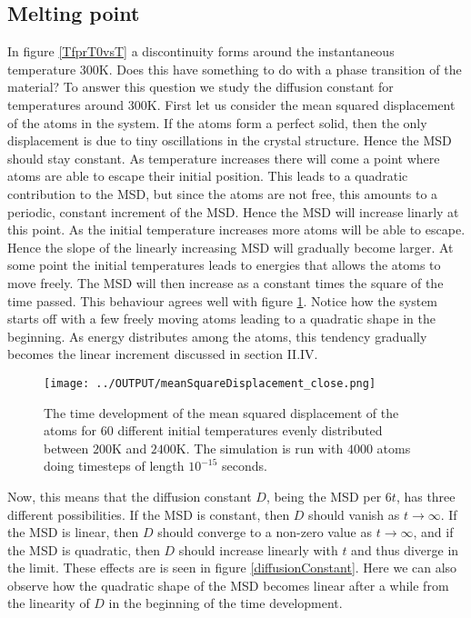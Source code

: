 \documentclass[twoside,utf8]{article}
\begin{document}
\begin{multicols}{2}
\subsection{Melting point}
In figure \ref*{TfprT0vsT} a discontinuity forms around the instantaneous temperature $300$K. Does this have something to do with a phase transition of the material? To answer this question we study the diffusion constant for temperatures around $300$K. First let us consider the mean squared displacement of the atoms in the system. If the atoms form a perfect solid, then the only displacement is due to tiny oscillations in the crystal structure. Hence the MSD should stay constant. As temperature increases there will come a point where atoms are able to escape their initial position. This leads to a quadratic contribution to the MSD, but since the atoms are not free, this amounts to a periodic, constant increment of the MSD. Hence the MSD will increase linarly at this point. As the initial temperature increases more atoms will be able to escape. Hence the slope of the linearly increasing MSD will gradually become larger. At some point the initial temperatures leads to energies that allows the atoms to move freely. The MSD will then increase as a constant times the square of the time passed. This behaviour agrees well with figure \ref*{MSD}. Notice how the system starts off with a few freely moving atoms leading to a quadratic shape in the beginning. As energy distributes among the atoms, this tendency gradually becomes the linear increment discussed in section II.IV. 

\begin{figure}[H]
\begin{center}
\texttt{[image: ../OUTPUT/meanSquareDisplacement\_close.png]}
\end{center}
\caption{
The time development of the mean squared displacement of the atoms for 60 different initial temperatures evenly distributed between $200$K and $2400$K. The simulation is run with $4000$ atoms doing timesteps of length $10^{-15}$ seconds.  
}
\label{MSD}
\end{figure}


\noindent
Now, this means that the diffusion constant $D$, being the MSD per $6t$, has three different possibilities. If the MSD is constant, then $D$ should vanish as $t\rightarrow \infty$. If the MSD is linear, then $D$ should converge to a non-zero value as $t\rightarrow \infty$, and if the MSD is quadratic, then $D$ should increase linearly with $t$ and thus diverge in the limit. These effects are is seen in figure \ref*{diffusionConstant}. Here we can also observe how the quadratic shape of the MSD becomes linear after a while from the linearity of $D$ in the beginning of the time development.




\end{multicols}
\end{document}
